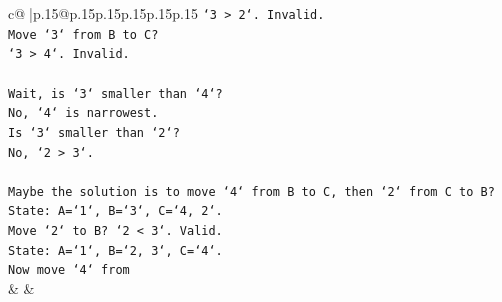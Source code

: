 \documentclass{article}
\begin{document}
{\begin{supertabular}{c@{$\;$}|p{.15\linewidth}@{}p{.15\linewidth}p{.15\linewidth}p{.15\linewidth}p{.15\linewidth}p{.15\linewidth}}
{{{\texttt{`3 > 2`. Invalid.} \\
\texttt{Move `3` from B to C?} \\
\texttt{`3 > 4`. Invalid.} \\
\\ 
\texttt{Wait, is `3` smaller than `4`?} \\
\texttt{No, `4` is narrowest.} \\
\texttt{Is `3` smaller than `2`?} \\
\texttt{No, `2 > 3`.} \\
\\ 
\texttt{Maybe the solution is to move `4` from B to C, then `2` from C to B?} \\
\texttt{State: A=`1`, B=`3`, C=`4, 2`.} \\
\texttt{Move `2` to B? `2 < 3`. Valid.} \\
\texttt{State: A=`1`, B=`2, 3`, C=`4`.} \\
\texttt{Now move `4` from} \\
            }
        }
    }
    & & \\ \\


\end{supertabular}}
\end{document}
